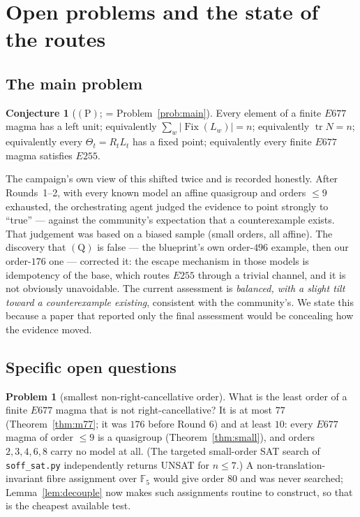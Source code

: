 \documentclass[11pt]{article}
\theoremstyle{plain}
\theoremstyle{definition}
\newtheorem{conjecture}[theorem]{Conjecture}
\newtheorem{problem}[theorem]{Problem}
\theoremstyle{remark}
\numberwithin{equation}{section}
\newcommand{\F}{\mathbb{F}}
\newcommand{\Fix}{\operatorname{Fix}}
\newcommand{\tr}{\operatorname{tr}}
\begin{document}
\section{Open problems and the state of the routes}\label{sec:open}

\subsection{The main problem}

\begin{conjecture}[$(\mathrm{P})$; = Problem~\ref{prob:main}]\label{conj:P}
Every element of a finite $E677$ magma has a left unit; equivalently
$\sum_{w}|\Fix(L_w)| = n$; equivalently $\tr N = n$; equivalently every $\Theta_t = R_tL_t$
has a fixed point; equivalently every finite $E677$ magma satisfies $E255$.
\end{conjecture}

The campaign's own view of this shifted twice and is recorded honestly. After Rounds~1--2,
with every known model an affine quasigroup and orders $\le9$ exhausted, the orchestrating
agent judged the evidence to point strongly to ``true'' --- against the community's
expectation \cite{etp,formalconjectures} that a counterexample exists. That judgement was
based on a biased sample (small orders, all affine). The discovery that $(\mathrm{Q})$ is
false --- the blueprint's own order-$496$ example, then our order-$176$ one --- corrected it:
the escape mechanism in those models is idempotency of the base, which routes $E255$ through
a trivial channel, and it is not obviously unavoidable. The current assessment is
\emph{balanced, with a slight tilt toward a counterexample existing}, consistent with the
community's. We state this because a paper that reported only the final assessment would be
concealing how the evidence moved.

\subsection{Specific open questions}

\begin{problem}[smallest non-right-cancellative order]
What is the least order of a finite $E677$ magma that is not right-cancellative? It is at most
$77$ (Theorem~\ref{thm:m77}; it was $176$ before Round 6) and at least $10$: every $E677$ magma of order $\le 9$ is a
quasigroup (Theorem~\ref{thm:small}), and orders $2,3,4,6,8$ carry no model at all. (The
targeted small-order SAT search of \texttt{soff\_sat.py} independently returns UNSAT for
$n\le7$.) A
non-translation-invariant fibre assignment over $\F_5$ would give order $80$ and was never
searched; Lemma~\ref{lem:decouple} now makes such assignments routine to construct,
so that is the cheapest available test.
\end{problem}
\end{document}
